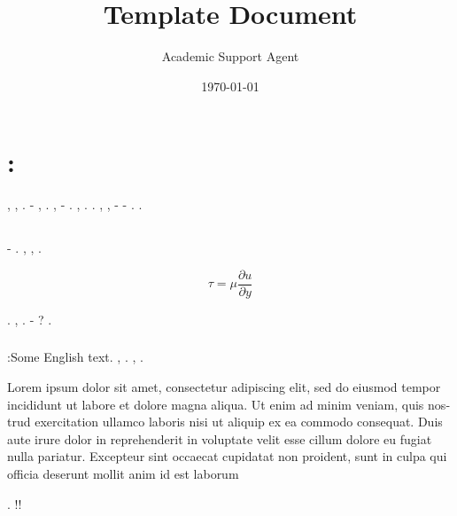 \documentclass{article}
\title{Template Document}
\author{Academic Support Agent}
\date{\today}
\begin{document}
\maketitle

\maketitle

\section{ :  } %

         ,              ,    .         -    ,        .        ,         -            .              ,      .      .          ,  ,     -     -    .          .  

\subsection{   }

        -              .            ,          ,          .

\begin{equation}\label{eq:visc}
\tau = \mu \frac{\partial u}{\partial y}
\end{equation}

   .        ,    .           -      ?    .

\subsubsection{     }

             :\textenglish{Some English text}.            ,                  .        ,        . 

\begin{english}
    Lorem ipsum dolor sit amet, consectetur adipiscing elit, sed do eiusmod tempor incididunt ut labore et dolore magna aliqua. Ut enim ad minim veniam, quis nostrud exercitation ullamco laboris nisi ut aliquip ex ea commodo consequat. Duis aute irure dolor in reprehenderit in voluptate velit esse cillum dolore eu fugiat nulla pariatur. Excepteur sint occaecat cupidatat non proident, sunt in culpa qui officia deserunt mollit anim id est laborum
\end{english}

             .         !!
\end{document}
